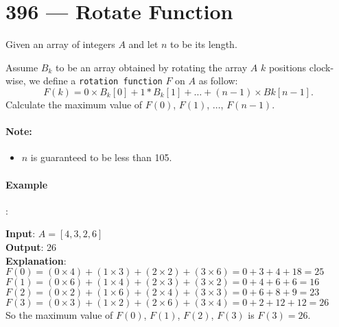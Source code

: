 \section{396 --- Rotate Function}
Given an array of integers $ A $ and let $ n $ to be its length.
\par
Assume $ B_k $ to be an array obtained by rotating the array $ A $ $k$ positions clock-wise, we define a \texttt{rotation function} $ F $ on $ A $ as follow:
\[
F(k) = 0 \times B_k[0] + 1 * B_k[1] + \ldots + (n-1) \times Bk[n-1].
\]
Calculate the maximum value of $F(0)$, $F(1)$, $\ldots$, $F(n-1)$.

\paragraph{Note:}
\begin{itemize}
\item $ n $ is guaranteed to be less than 105.
\end{itemize}

\paragraph{Example}:
\begin{flushleft}
\textbf{Input}: $A=[4,3,2,6]$
\\
\textbf{Output}: 26
\\
\textbf{Explanation}:
\\
$F(0) = (0 \times 4) + (1 \times 3) + (2 \times 2) + (3 \times 6) = 0 + 3 + 4 + 18 = 25$
\\
$F(1) = (0 \times 6) + (1 \times 4) + (2 \times 3) + (3 \times 2) = 0 + 4 + 6 + 6 = 16$
\\
$F(2) = (0 \times 2) + (1 \times 6) + (2 \times 4) + (3 \times 3) = 0 + 6 + 8 + 9 = 23$
\\
$F(3) = (0 \times 3) + (1 \times 2) + (2 \times 6) + (3 \times 4) = 0 + 2 + 12 + 12 = 26$
\\
So the maximum value of $ F(0) $, $ F(1) $, $ F(2) $, $ F(3) $ is $ F(3) = 26 $.
\end{flushleft}

